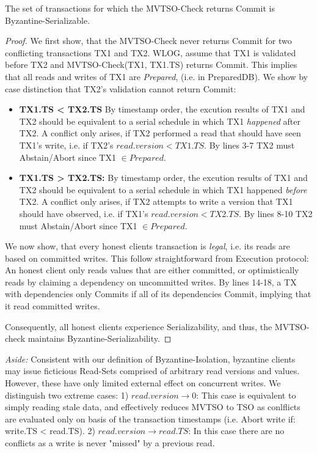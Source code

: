 \begin{theorem}
The set of transactions for which the MVTSO-Check returns Commit is Byzantine-Serializable. 
\end{theorem}
\begin{proof}
We first show, that the MVTSO-Check never returns Commit for two conflicting transactions TX1 and TX2.
WLOG, assume that TX1 is validated before TX2 and MVTSO-Check(TX1, TX1.TS) returns Commit. This implies that all reads and writes of TX1 are \textit{Prepared}, (i.e. in PreparedDB).
We show by case distinction that TX2's validation cannot return Commit:
\begin{itemize}

\item \textbf{TX1.TS < TX2.TS} By timestamp order, the excution results of TX1 and TX2 should be equivalent to a serial schedule in which TX1 \textit{happened} after TX2. A conflict only arises, if TX2 performed a read that should have seen TX1's write, i.e. if TX2's $read.version < TX1.TS$. By lines 3-7 TX2 must Abstain/Abort since TX1 $\in Prepared$. 

\item \textbf{TX1.TS > TX2.TS:} By timestamp order, the excution results of TX1 and TX2 should be equivalent to a serial schedule in which TX1 happened \textit{before} TX2. A conflict only arises, if TX2 attempts to write a version that TX1 should have observed, i.e. if TX1's $read.version < TX2.TS$. By lines 8-10 TX2 must Abstain/Abort since TX1 $\in Prepared$. 
\end{itemize}

We now show, that every honest clients transaction is \textit{legal}, i.e. its reads are based on committed writes. This follow straightforward from Execution protocol: An honest client only reads values that are either committed, or optimistically reads by claiming a dependency on uncommitted writes. By lines 14-18, a TX with dependencies only Commits if all of its dependencies Commit, implying that it read committed writes.

Consequently, all honest clients experience Serializability, and thus, the MVTSO-check maintains Byzantine-Serializability.
\end{proof}

\textit{Aside:} Consistent with our definition of Byzantine-Isolation, byzantine clients may issue ficticious Read-Sets comprised of arbitrary read versions and values. However, these have only limited external effect on concurrent writes. We distinguish two extreme cases: 1) $read.version \rightarrow 0$: This case is equivalent to simply reading stale data, and effectively reduces MVTSO to TSO as conlflicts are evaluated only on basis of the transaction timestamps (i.e. Abort write if: write.TS < read.TS). 2) $read.version \rightarrow read.TS$: In this case there are no conflicts as a write is never "missed" by a previous read.

